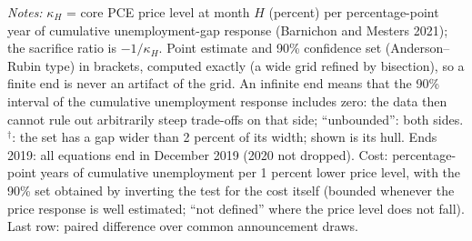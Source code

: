 \begin{table}[tp]
\begin{flushleft}\footnotesize\textit{Notes:} $\kappa_H$ = core PCE price level at month $H$ (percent) per percentage-point year of cumulative unemployment-gap response (Barnichon and Mesters 2021); the sacrifice ratio is $-1/\kappa_H$. Point estimate and 90\% confidence set (Anderson--Rubin type) in brackets, computed exactly (a wide grid refined by bisection), so a finite end is never an artifact of the grid. An infinite end means that the 90\% interval of the cumulative unemployment response includes zero: the data then cannot rule out arbitrarily steep trade-offs on that side; ``unbounded'': both sides. $^{\dagger}$: the set has a gap wider than 2 percent of its width; shown is its hull. Ends 2019: all equations end in December 2019 (2020 not dropped). Cost: percentage-point years of cumulative unemployment per 1 percent lower price level, with the 90\% set obtained by inverting the test for the cost itself (bounded whenever the price response is well estimated; ``not defined'' where the price level does not fall). Last row: paired difference over common announcement draws.\end{flushleft}
\end{table}
